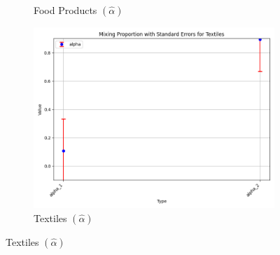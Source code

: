 \documentclass{article}
\begin{document}
\begin{figure}[ht!]
\begin{subfigure}[t]{0.32\textwidth}
        \caption{Food Products  $(\hat\alpha)$}
    \end{subfigure}
    \begin{subfigure}[t]{0.32\textwidth}
        \centering
        \includegraphics[width=\textwidth]{figure/empirical_ar1_mixture_kmshare_ciiu_alpha_with_error_bars_Textiles.png}
        \caption{Textiles $(\hat\alpha)$}
    \end{subfigure}


\end{figure}
\end{document}
